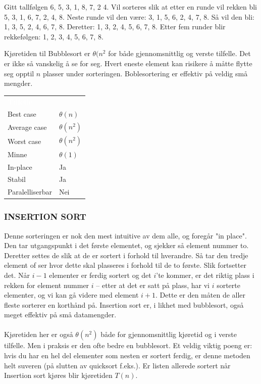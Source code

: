 \begin{boxed}
Gitt tallfølgen 6, 5, 3, 1, 8, 7, 2 4. Vil sorteres slik at etter en runde vil rekken bli 5, 3, 1, 6, 7, 2, 4, 8. Neste runde vil den være: 3, 1, 5, 6, 2, 4, 7, 8. Så vil den bli: 1, 3, 5, 2, 4, 6, 7, 8. Deretter: 1, 3, 2, 4, 5, 6, 7, 8. Etter fem runder blir rekkefølgen: 1, 2, 3, 4, 5, 6, 7, 8.
\end{boxed}

\noindent Kjøretiden til Bubblesort er \textbf{$\theta(n^2$} for både gjennomsnittlig og verste tilfelle. Det er ikke så vanskelig å se for seg. Hvert eneste element kan risikere å måtte flytte seg opptil $n$ plasser under sorteringen. Boblesortering er effektiv på veldig små mengder.

\begin{table}[H]
    \label{tab:bubblesort}
    \centering
    \begin{tabular}{|L{15em} | L{15em}|}
        \hline
        \textbf{\textcolor{white}{Tilfelle}} & \textbf{\textcolor{white}{}}\\
        Best case & $\theta(n)$\\
        Average case & $\theta(n^2)$\\
        Worst case & $\theta(n^2)$\\
        Minne & $\theta(1)$\\
        In-place & Ja\\
        Stabil & Ja\\
        Paralelliserbar & Nei\\
         \hline
    \end{tabular}
\end{table}

\subsubsection{INSERTION SORT}
Denne sorteringen er nok den mest intuitive av dem alle, og foregår "in place". Den tar utgangspunkt i det første elementet, og sjekker så element nummer to. Deretter settes de slik at de er sortert i forhold til hverandre. Så tar den tredje element of ser hvor dette skal plasseres i forhold til de to første. Slik fortsetter det. Når $i - 1$ elementer er ferdig sortert og det $i$'te kommer, er det riktig plass i rekken for element nummer $i$ – etter at det er satt på plass, har vi $i$ sorterte elementer, og vi kan gå videre med element $i + 1$. Dette er den måten de aller fleste sorterer en korthånd på. Insertion sort er, i likhet med bubblesort, også meget effektiv på små datamengder. 
\\\\
Kjøretiden her er også \textbf{$\theta(n^2)$} både for gjennomsnittlig kjøretid og i verste tilfelle. Men i praksis er den ofte bedre en bubblesort. Et veldig viktig poeng er: hvis du har en hel del elementer som nesten er sortert ferdig, er denne metoden helt suveren (på slutten av quicksort f.eks.). Er listen allerede sortert når Insertion sort kjøres blir kjøretiden $T(n)$.

